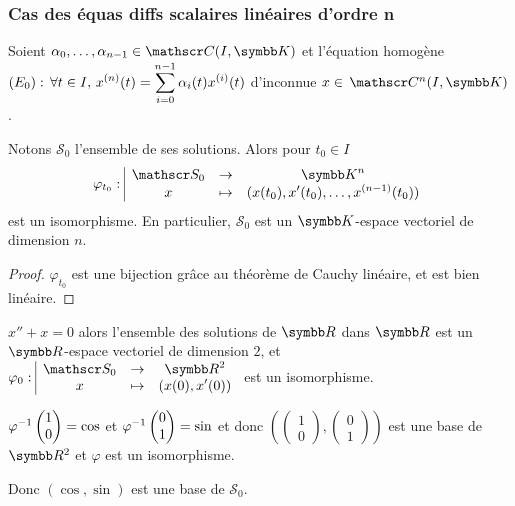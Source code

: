 \subsubsection{Cas des équas diffs scalaires linéaires d'ordre n}

\begin{proposition}{}{}
    Soient $\alpha_0, \dots, \alpha_{n - 1} \in \mathscr C(I, \K)$ et l'équation homogène
    $(E_0) : \, \forall t \in I, \, \displaystyle x^{(n)}(t) = \sum_{i = 0}^{n - 1} \alpha_i(t) x^{(i)}(t)$
    d'inconnue $x \in \mc n (I, \K)$.

    
    \lvspace \avspace Notons $\mathscr S_0$ l'ensemble de ses solutions. Alors pour $t_0 \in I$ 
    $$\fonction{\varphi_{t_0}}{\mathscr S_0}{\K^n}{x}{(x(t_0), x'(t_0), \dots, x^{(n - 1)}(t_0))}$$ est un isomorphisme. 
    En particulier, $\mathscr S_0$ est un $\K$-espace vectoriel de dimension $n$.
\end{proposition}

\begin{proof}
    $\varphi_{t_0}$ est une bijection grâce au théorème de Cauchy linéaire, et est 
    bien linéaire. 
\end{proof}

\begin{exemple}
    $x'' + x = 0$ alors l'ensemble des solutions de $\R$ dans $\R$ est un 
    $\R$-espace vectoriel de dimension $2$, et 
    $\fonction{\varphi_0}{\mathscr S_0}{\R^2}{x}{(x(0), x'(0))}$ est un isomorphisme.

    $\varphi^{-1} \begin{pmatrix}
    1 \\ 0
    \end{pmatrix} = \cos$ et $\varphi^{-1} \begin{pmatrix}
    0 \\ 1
    \end{pmatrix} = \sin$ et donc $\left( \begin{pmatrix}
        1 \\ 0
    \end{pmatrix}, 
    \begin{pmatrix}
        0 \\ 1
    \end{pmatrix} \right)$ est une base de $\R^2$ et $\varphi$ est un isomorphisme. 

    Donc $(\cos, \sin)$ est une base de $\mathscr S_0$. 
\end{exemple}

